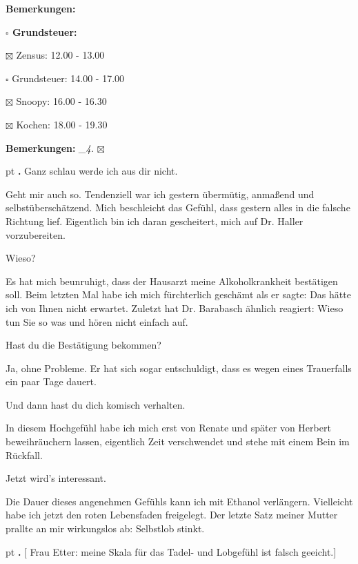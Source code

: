 \documentclass[10pt,a4paper]{article}
\newcounter{notec}
\newcommand\notep[1]{%
  \stepcounter{notec}
  \vskip #1pt
  {\bf\arabic{notec}.}
}
\newcommand\prop[1] {{\color {alizarin} {\bf #1}}}             %
\newcommand\mand[1] {{\color {burntorange} {\bf #1}}}          %
\newcommand\bottomspace{\vskip 4pt}
\newcommand\n[1] { {\sl #1.} \hskip 5pt }
\begin{document}
\begin{mdframed}[style=daystyle]
\begin{labeling}{{\mand {Bemerkungen:}}}
\begin{minipage}{0.75\textwidth}
\begin{labeling}{\prop {$\square$ {Grundsteuer:}}}
      \item[$\boxtimes$ Zensus:]    12.00 - 13.00
      \item[$\square$ Grundsteuer:] 14.00 - 17.00
      \item[$\boxtimes$ Snoopy:]    16.00 - 16.30        
      \item[$\boxtimes$ Kochen:]    18.00 - 19.30
      \end{labeling}
    \end{minipage}
    \bottomspace
  \item[{\mand {Bemerkungen:}}]   \n{\_4} $\boxtimes$
  \end{labeling}
    
  \setcounter{notec}{0}

  \notep 0 Ganz schlau werde ich aus dir nicht.

  \vskip 2pt
  Geht mir auch so. Tendenziell war ich gestern übermütig, anmaßend und
  selbstüberschätzend. Mich beschleicht das Gefühl, dass gestern alles in die
  falsche Richtung lief. Eigentlich bin ich daran gescheitert, mich auf Dr.
  Haller vorzubereiten.

  \vskip 2pt
  Wieso?

  \vskip 2pt
  Es hat mich beunruhigt, dass der Hausarzt meine Alkoholkrankheit bestätigen
  soll. Beim letzten Mal habe ich mich fürchterlich geschämt als er sagte: Das
  hätte ich von Ihnen nicht erwartet. Zuletzt hat Dr. Barabasch ähnlich
  reagiert: Wieso tun Sie so was und hören nicht einfach auf.

  \vskip 2pt
  Hast du die Bestätigung bekommen?

  \vskip 2pt
  Ja, ohne Probleme. Er hat sich sogar entschuldigt, dass es wegen eines
  Trauerfalls ein paar Tage dauert.

  \vskip 2pt
  Und dann hast du dich komisch verhalten.
  
  \vskip 2pt
  In diesem Hochgefühl habe ich mich erst von Renate und später von Herbert
  beweihräuchern lassen, eigentlich Zeit verschwendet und stehe mit einem Bein
  im Rückfall.

  \vskip 2pt
  Jetzt wird’s interessant.

  \vskip 2pt
  Die Dauer dieses angenehmen Gefühls kann ich mit Ethanol verlängern.
  Vielleicht habe ich jetzt den roten Lebensfaden freigelegt. Der letzte Satz
  meiner Mutter prallte an mir wirkungslos ab: Selbstlob stinkt.

  \notep 4 $[$ Frau Etter: meine Skala für das Tadel- und Lobgefühl ist falsch
    geeicht.$]$


\end{mdframed}
\end{document}

